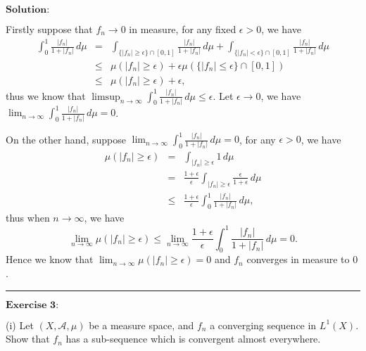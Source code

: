 \documentclass[12pt,a4paper]{ctexart}
\begin{document}
\vspace{8pt}
$\textbf{Solution:}$

Firstly suppose that $f_{n} \to 0$ in measure, for any fixed $\epsilon > 0$, we have
\begin{eqnarray*}
    \int_{0}^{1} \frac{|f_{n}|}{1 + |f_{n}|} \, d \mu & = & \int_{\{|f_{n}| \geq \epsilon\} \cap [0, 1]}^{} \frac{|f_{n}|}{1 + |f_{n}|} \, d \mu + \int_{\{|f_{n}| < \epsilon\} \cap [0, 1]}^{} \frac{|f_{n}|}{1 + |f_{n}|} \, d \mu \\
    & \leq & \mu({|f_{n}| \geq \epsilon}) + \epsilon \mu(\{|f_{n}| \leq \epsilon\} \cap [0, 1]) \\
    & \leq & \mu({|f_{n}| \geq \epsilon}) + \epsilon,
\end{eqnarray*}
thus we know that $\limsup_{n \to \infty} \int_{0}^{1} \frac{|f_{n}|}{1 + |f_{n}|} \, d \mu \leq \epsilon $. Let $\epsilon \to 0$, we have $\lim_{n \to \infty} \int_{0}^{1} \frac{|f_{n}|}{1 + |f_{n}|} \, d \mu = 0$.

On the other hand, suppose $\lim_{n \to \infty} \int_{0}^{1} \frac{|f_{n}|}{1 + |f_{n}|} \, d \mu = 0$, for any $\epsilon > 0$, we have
\begin{eqnarray*}
     \mu(|f_{n}| \geq \epsilon) & = & \int_{|f_{n}| \geq \epsilon}^{} 1 \, d \mu  \\
     & = & \frac{1 + \epsilon}{\epsilon} \int_{|f_{n}| \geq \epsilon}^{} \frac{\epsilon}{1 + \epsilon} \, d \mu \\
    & \leq & \frac{1 + \epsilon}{\epsilon} \int_{0}^{1} \frac{|f_{n}|}{1 + |f_{n}|} \, d \mu,
\end{eqnarray*}
thus when $n \to \infty$, we have
\begin{equation*}
    \lim_{n \to \infty} \mu(|f_{n}| \geq \epsilon) \leq  \lim_{n \to \infty} \frac{1 + \epsilon}{\epsilon} \int_{0}^{1} \frac{|f_{n}|}{1 + |f_{n}|} \, d \mu = 0.
\end{equation*}
Hence we know that $\lim_{n \to \infty} \mu(|f_{n}| \geq \epsilon) = 0$ and $f_{n}$ converges in measure to $0$.


\noindent\rule[0.25\baselineskip]{\textwidth}{0.5pt}

\vspace{8pt}

$\textbf{Exercise 3:}$

(i) Let $(X, \mathcal{A}, \mu)$ be a measure space, and $f_{n}$ a converging sequence in $L^{1}(X)$. Show that $f_{n}$ has a sub-sequence which is convergent almost everywhere.
\vspace{8pt}
\end{document}

